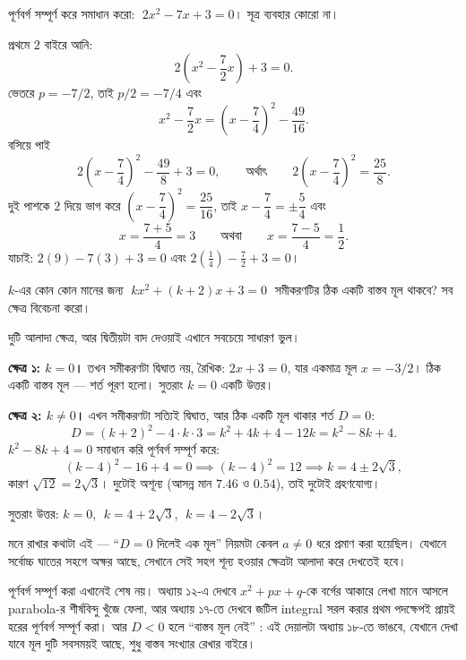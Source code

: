 \documentclass[11pt]{article}
\begin{document}
 পূর্ণবর্গ সম্পূর্ণ করে সমাধান করো: $\;2x^{2} - 7x + 3 = 0$। সূত্র
ব্যবহার কোরো না।

\begin{sol}
প্রথমে $2$ বাইরে আনি:
\[
  2\left( x^{2} - \frac{7}{2}x \right) + 3 = 0 .
\]
ভেতরে $p = -7/2$, তাই $p/2 = -7/4$ এবং
\[
  x^{2} - \frac{7}{2}x = \left( x - \frac{7}{4} \right)^{2} - \frac{49}{16}.
\]
বসিয়ে পাই
\[
  2\left( x - \frac{7}{4} \right)^{2} - \frac{49}{8} + 3 = 0,
  \qquad\text{অর্থাৎ}\qquad
  2\left( x - \frac{7}{4} \right)^{2} = \frac{25}{8}.
\]
দুই পাশকে $2$ দিয়ে ভাগ করে $\left( x - \dfrac{7}{4} \right)^{2} = \dfrac{25}{16}$,
তাই $x - \dfrac{7}{4} = \pm\dfrac{5}{4}$ এবং
\[
  x = \frac{7 + 5}{4} = 3 \qquad\text{অথবা}\qquad x = \frac{7 - 5}{4} = \frac{1}{2}.
\]
যাচাই: $2(9) - 7(3) + 3 = 0$ এবং $2\left(\tfrac{1}{4}\right) - \tfrac{7}{2} + 3 = 0$।
\end{sol}

 $k$-এর কোন কোন মানের জন্য $\;kx^{2} + (k+2)x + 3 = 0\;$ সমীকরণটির ঠিক
একটি বাস্তব মূল থাকবে? সব ক্ষেত্র বিবেচনা করো।

\begin{sol}
দুটি আলাদা ক্ষেত্র, আর দ্বিতীয়টা বাদ দেওয়াই এখানে সবচেয়ে সাধারণ ভুল।

\textbf{ক্ষেত্র ১: $k = 0$।} তখন সমীকরণটা দ্বিঘাত নয়, রৈখিক: $2x + 3 = 0$,
যার একমাত্র মূল $x = -3/2$। ঠিক একটি বাস্তব মূল --- শর্ত পূরণ হলো। সুতরাং
$k = 0$ একটি উত্তর।

\textbf{ক্ষেত্র ২: $k \neq 0$।} এখন সমীকরণটা সত্যিই দ্বিঘাত, আর ঠিক একটি মূল
থাকার শর্ত $D = 0$:
\[
  D = (k+2)^{2} - 4 \cdot k \cdot 3 = k^{2} + 4k + 4 - 12k = k^{2} - 8k + 4 .
\]
$k^{2} - 8k + 4 = 0$ সমাধান করি পূর্ণবর্গ সম্পূর্ণ করে:
\[
  (k - 4)^{2} - 16 + 4 = 0 \implies (k-4)^{2} = 12 \implies k = 4 \pm 2\sqrt{3},
\]
কারণ $\sqrt{12} = 2\sqrt{3}$। দুটোই অশূন্য (আসন্ন মান $7.46$ ও $0.54$), তাই
দুটোই গ্রহণযোগ্য।

সুতরাং উত্তর: $k = 0$, $\;k = 4 + 2\sqrt{3}$, $\;k = 4 - 2\sqrt{3}$।

মনে রাখার কথাটা এই --- ``$D = 0$ দিলেই এক মূল'' নিয়মটা কেবল $a \neq 0$ ধরে
প্রমাণ করা হয়েছিল। যেখানে সর্বোচ্চ ঘাতের সহগে অক্ষর আছে, সেখানে সেই সহগ শূন্য
হওয়ার ক্ষেত্রটা আলাদা করে দেখতেই হবে।
\end{sol}

\begin{remark}
পূর্ণবর্গ সম্পূর্ণ করা এখানেই শেষ নয়। অধ্যায় ১২-এ দেখবে $x^{2} + px + q$-কে
বর্গের আকারে লেখা মানে আসলে parabola-র শীর্ষবিন্দু খুঁজে ফেলা, আর অধ্যায় ১৭-তে
দেখবে জটিল integral সরল করার প্রথম পদক্ষেপই প্রায়ই হরের পূর্ণবর্গ সম্পূর্ণ করা।
আর $D < 0$ হলে ``বাস্তব মূল নেই'' : এই দেয়ালটা অধ্যায় ১৮-তে ভাঙবে, যেখানে
দেখা যাবে মূল দুটি সবসময়ই আছে, শুধু বাস্তব সংখ্যার রেখার বাইরে।
\end{remark}
\end{document}
